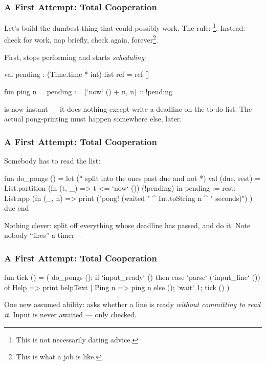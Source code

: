 \documentclass[aspectratio=169]{beamer}
\begin{document}
\begin{frame}[fragile]
  \frametitle{A First Attempt: Total Cooperation}

  Let's build the dumbest thing that could possibly work. The rule:
  \footnote{This is not necessarily
  dating advice.}. Instead: check for work, nap briefly, check again, forever\footnote{This is what a job is like.}.

  \pause
  \vspace{\fill}

  First,  stops performing and starts \textit{scheduling}:

  \begin{codeblock}
    val pending : (Time.time * int) list ref = ref []

    fun ping n =
      pending := (`now` () + n, n) :: !pending
\end{codeblock}

  \pause
  \vspace{\fill}

   is now instant --- it does nothing except write a deadline
  on the to-do list. The actual pong-printing must happen somewhere
  else, later.
\end{frame}

\begin{frame}[fragile]
  \frametitle{A First Attempt: Total Cooperation}

  Somebody has to read the list:

  {\small
  \begin{codeblock}
    fun do_pongs () =
      let
        (* split into the ones past due and not *)
        val (due, rest) =
          List.partition (fn (t, _) => t <= `now` ()) (!pending)
      in
        pending := rest;
        List.app (fn (_, n) =>
          print ("pong! (waited " ^ Int.toString n ^ " seconds)")
        ) due
      end
\end{codeblock}}
  \pause
  \vspace{\fill}

  Nothing clever: split off everything whose deadline has passed, and
  do it. Note nobody ``fires'' a timer --- 
\end{frame}

\begin{frame}[fragile]
  \frametitle{A First Attempt: Total Cooperation}

  \begin{codeblock}
    fun tick () =
      ( do_pongs ();
        if `input_ready` ()
        then case `parse` (`input_line` ()) of
               Help   => print helpText
             | Ping n => ping n
        else ();
        `wait` 1;
        tick () )
\end{codeblock}

  \pause
  \vspace{\fill}

  One new assumed ability:  asks whether a line is
  ready \textit{without committing to read it}. Input is never awaited ---
  only checked.
\end{frame}
\end{document}
